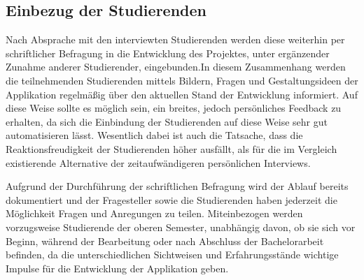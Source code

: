 \documentclass[bibliography=totoc,listof=totoc,BCOR=5mm,DIV=12,oneside]{scrbook}
\begin{document}
\subsection{Einbezug der Studierenden}
\par Nach Absprache mit den interviewten Studierenden werden diese weiterhin per schriftlicher Befragung in die Entwicklung des Projektes, unter ergänzender Zunahme anderer Studierender, eingebunden.In diesem Zusammenhang werden die teilnehmenden Studierenden mittels Bildern, Fragen und Gestaltungsideen der Applikation regelmäßig über den aktuellen Stand der Entwicklung informiert. Auf diese Weise sollte es möglich sein, ein breites, jedoch persönliches Feedback zu erhalten, da sich die Einbindung der Studierenden auf diese Weise sehr gut automatisieren lässt. Wesentlich dabei ist auch die Tatsache, dass die Reaktionsfreudigkeit der Studierenden höher ausfällt, als für die im Vergleich existierende Alternative der zeitaufwändigeren persönlichen Interviews.
\par \bigskip Aufgrund der Durchführung der schriftlichen Befragung wird der Ablauf bereits dokumentiert und der Fragesteller sowie die Studierenden haben jederzeit die Möglichkeit Fragen und Anregungen zu teilen. Miteinbezogen werden vorzugsweise Studierende der oberen Semester, unabhängig davon, ob sie sich vor Beginn, während der Bearbeitung oder nach Abschluss der Bachelorarbeit befinden, da die unterschiedlichen Sichtweisen und Erfahrungsstände wichtige Impulse für die Entwicklung der Applikation geben.

\newpage
\end{document}
